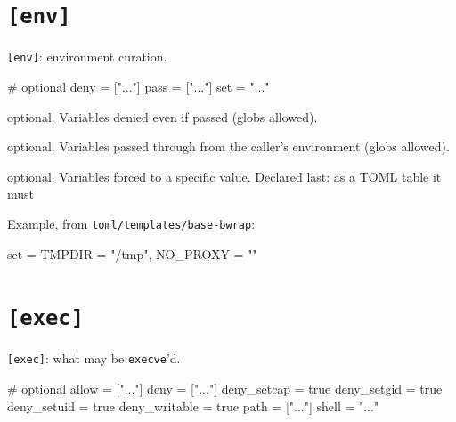 \hypertarget{env}{%
\section{\texorpdfstring{\texttt{{[}env{]}}}{{[}env{]}}}\label{env}}

\texttt{{[}env{]}}: environment curation.

\begin{kennelcode}
[env]
# optional
deny     = ["..."]
pass     = ["..."]
set      = "..."
\end{kennelcode}

\begin{description}
\tightlist
\item[\texttt{deny}]
optional. Variables denied even if passed (globs allowed).
\item[\texttt{pass}]
optional. Variables passed through from the caller's environment (globs
allowed).
\item[\texttt{set}]
optional. Variables forced to a specific value. Declared last: as a TOML
table it must
\end{description}

Example, from \texttt{toml/templates/base-bwrap}:

\begin{kennelcode}
[env]
set = { TMPDIR = "/tmp", NO_PROXY = "" }
\end{kennelcode}

\hypertarget{exec}{%
\section{\texorpdfstring{\texttt{{[}exec{]}}}{{[}exec{]}}}\label{exec}}

\texttt{{[}exec{]}}: what may be \texttt{execve}'d.

\begin{kennelcode}
[exec]
# optional
allow    = ["..."]
deny     = ["..."]
deny_setcap = true
deny_setgid = true
deny_setuid = true
deny_writable = true
path     = ["..."]
shell    = "..."
\end{kennelcode}


